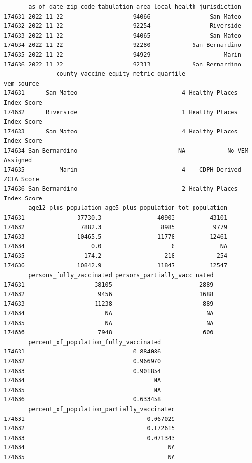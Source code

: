 \documentclass[
  letterpaper,
  DIV=11,
  numbers=noendperiod]{scrartcl}
\begin{document}
\begin{verbatim}
       as_of_date zip_code_tabulation_area local_health_jurisdiction
174631 2022-11-22                    94066                 San Mateo
174632 2022-11-22                    92254                 Riverside
174633 2022-11-22                    94065                 San Mateo
174634 2022-11-22                    92280            San Bernardino
174635 2022-11-22                    94929                     Marin
174636 2022-11-22                    92313            San Bernardino
               county vaccine_equity_metric_quartile                 vem_source
174631      San Mateo                              4 Healthy Places Index Score
174632      Riverside                              1 Healthy Places Index Score
174633      San Mateo                              4 Healthy Places Index Score
174634 San Bernardino                             NA            No VEM Assigned
174635          Marin                              4    CDPH-Derived ZCTA Score
174636 San Bernardino                              2 Healthy Places Index Score
       age12_plus_population age5_plus_population tot_population
174631               37730.3                40903          43101
174632                7882.3                 8985           9779
174633               10465.5                11778          12461
174634                   0.0                    0             NA
174635                 174.2                  218            254
174636               10842.9                11847          12547
       persons_fully_vaccinated persons_partially_vaccinated
174631                    38105                         2889
174632                     9456                         1688
174633                    11238                          889
174634                       NA                           NA
174635                       NA                           NA
174636                     7948                          600
       percent_of_population_fully_vaccinated
174631                               0.884086
174632                               0.966970
174633                               0.901854
174634                                     NA
174635                                     NA
174636                               0.633458
       percent_of_population_partially_vaccinated
174631                                   0.067029
174632                                   0.172615
174633                                   0.071343
174634                                         NA
174635                                         NA

\end{verbatim}
\end{document}
